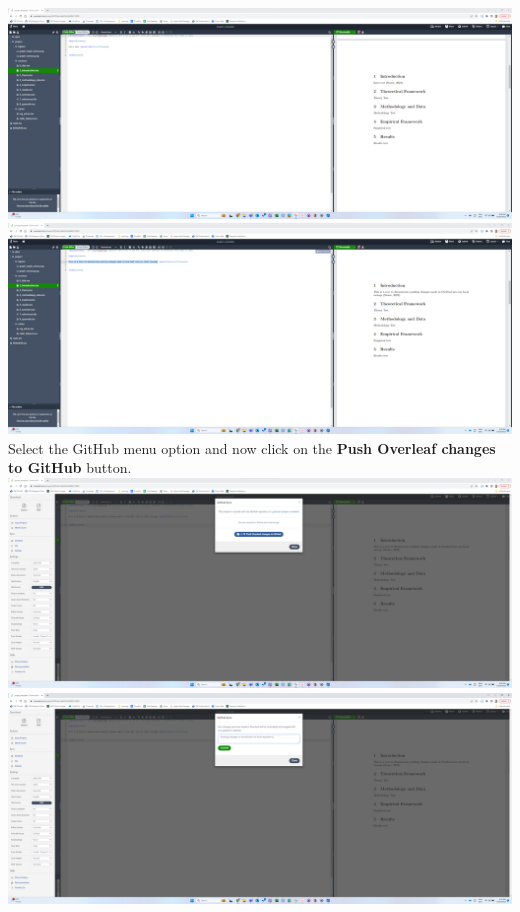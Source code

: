 \documentclass[12pt]{article}
\begin{document}
\includegraphics[width=1\textwidth]{Instructions/project_template_screenshots/project_template_27.png} \\

\includegraphics[width=1\textwidth]{Instructions/project_template_screenshots/project_template_28.png} \\

Select the GitHub menu option and now click on the \textbf{Push Overleaf changes to GitHub} button. \\

\includegraphics[width=1\textwidth]{Instructions/project_template_screenshots/project_template_29.png} \\

\includegraphics[width=1\textwidth]{Instructions/project_template_screenshots/project_template_30.png} \\
\end{document}
